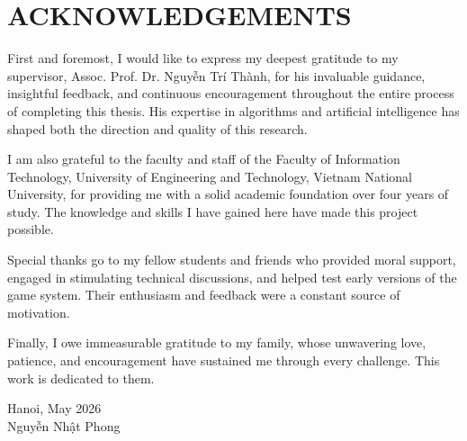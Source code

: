 \clearpage
{}
{}
\chapter*{ACKNOWLEDGEMENTS}

\vspace{1cm}

First and foremost, I would like to express my deepest gratitude to my supervisor, Assoc. Prof. Dr. Nguyễn Trí Thành, for his invaluable guidance, insightful feedback, and continuous encouragement throughout the entire process of completing this thesis. His expertise in algorithms and artificial intelligence has shaped both the direction and quality of this research.

I am also grateful to the faculty and staff of the Faculty of Information Technology, University of Engineering and Technology, Vietnam National University, for providing me with a solid academic foundation over four years of study. The knowledge and skills I have gained here have made this project possible.

Special thanks go to my fellow students and friends who provided moral support, engaged in stimulating technical discussions, and helped test early versions of the game system. Their enthusiasm and feedback were a constant source of motivation.

Finally, I owe immeasurable gratitude to my family, whose unwavering love, patience, and encouragement have sustained me through every challenge. This work is dedicated to them.

\vspace{3cm}

\begin{flushright}
Hanoi, May 2026\\[0.5em]
Nguyễn Nhật Phong
\end{flushright}
